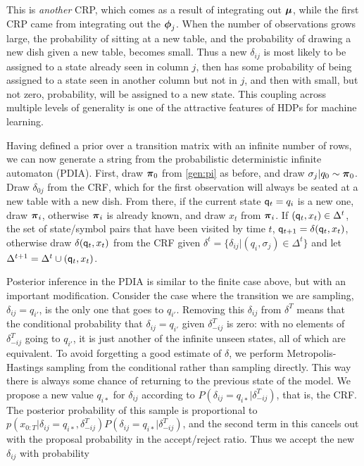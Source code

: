 {This is {\em another} CRP, which comes as a result of integrating out $\bmu$, while the first CRP came from integrating out the $\bphi_j$.  When the number of observations grows large, the probability of sitting at a new table, and the probability of drawing a new dish given a new table, becomes small.  Thus a new $\delta_{ij}$ is most likely to be assigned to a state already seen in column $j$, then has some probability of being assigned to a state seen in another column but not in $j$, and then with small, but not zero, probability, will be assigned to a new state.  This coupling across multiple levels of generality is one of the attractive features of HDPs for machine learning.

Having defined a prior over a transition matrix with an infinite number of rows, we can now generate a string from the probabilistic deterministic infinite automaton (PDIA).  First, draw $\bpi_0$ from \eqref{gen:pi} as before, and draw $\sigma_j|q_0 \sim \bpi_0$.  Draw $\delta_{0j}$ from the CRF, which for the first observation will always be seated at a new table with a new dish.  From there, if the current state $\q_t = q_i$ is a new one, draw $\bpi_i$, otherwise $\bpi_i$ is already known, and draw $x_t$ from $\bpi_i$.  If $(\q_t,x_t) \in \Delta^t$, the set of state/symbol pairs that have been visited by time $t$, $\q_{t+1} = \delta(\q_t,x_t)$, otherwise draw $\delta(\q_t,x_t)$ from the CRF given $\delta^t = \{\delta_{ij}|(q_i,\sigma_j)\in\Delta^t\}$ and let $\Delta^{t+1} = \Delta^t \cup (\q_t,x_t)$.

Posterior inference in the PDIA is similar to the finite case above, but with an important modification.  Consider the case where the transition we are sampling, $\delta_{ij} = q_{i'}$, is the only one that goes to $q_{i'}$.  Removing this $\delta_{ij}$ from $\delta^T$ means that the conditional probability that $\delta_{ij} = q_{i'}$ given $\delta^T_{-ij}$ is zero: with no elements of $\delta^T_{-ij}$ going to $q_{i'}$, it is just another of the infinite unseen states, all of which are equivalent.  To avoid forgetting a good estimate of $\delta$, we perform Metropolis-Hastings sampling from the conditional rather than sampling directly.  This way there is always some chance of returning to the previous state of the model.  We propose a new value $q_{i*}$ for $\delta_{ij}$ according to $P(\delta_{ij} = q_{i*}|\delta^T_{-ij})$, that is, the CRF.  The posterior probability of this sample is proportional to $p(x_{0:T}|\delta_{ij}=q_{i*},\delta^T_{-ij})P(\delta_{ij} = q_{i*}|\delta^T_{-ij})$, and the second term in this cancels out with the proposal probability in the accept/reject ratio. Thus we accept the new $\delta_{ij}$ with probability

}
